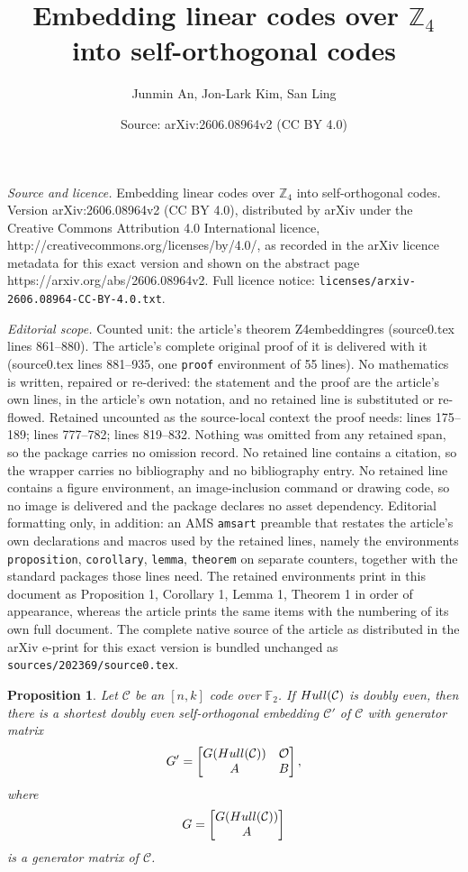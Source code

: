\documentclass[10pt,a4paper]{amsart}
\title{Embedding linear codes over $\mathbb{Z}_4$ into self-orthogonal codes}
\author{Junmin An, Jon-Lark Kim, San Ling}
\date{Source: arXiv:2606.08964v2 (CC BY 4.0)}
\newtheorem{proposition}{Proposition}
\begin{document}
\maketitle

\noindent\emph{Source and licence.} Embedding linear codes over $\mathbb{Z}_4$ into self-orthogonal codes. Version arXiv:2606.08964v2 (CC BY 4.0), distributed by arXiv under the Creative Commons Attribution 4.0 International licence, http://creativecommons.org/licenses/by/4.0/, as recorded in the arXiv licence metadata for this exact version and shown on the abstract page https://arxiv.org/abs/2606.08964v2. Full licence notice: \texttt{licenses/arxiv-2606.08964-CC-BY-4.0.txt}.\par\smallskip

\noindent\textit{Editorial scope.} Counted unit: the article's theorem Z4embeddingres (source0.tex lines 861--880). The article's complete original proof of it is delivered with it (source0.tex lines 881--935, one \texttt{proof} environment of 55 lines). No mathematics is written, repaired or re-derived: the statement and the proof are the article's own lines, in the article's own notation, and no retained line is substituted or re-flowed.  Retained uncounted as the source-local context the proof needs: lines 175--189; lines 777--782; lines 819--832.  Nothing was omitted from any retained span, so the package carries no omission record.  No retained line contains a citation, so the wrapper carries no bibliography and no bibliography entry.  No retained line contains a figure environment, an image-inclusion command or drawing code, so no image is delivered and the package declares no asset dependency.  Editorial formatting only, in addition: an AMS \texttt{amsart} preamble that restates the article's own declarations and macros used by the retained lines, namely the environments \texttt{proposition}, \texttt{corollary}, \texttt{lemma}, \texttt{theorem} on separate counters, together with the standard packages those lines need.  The retained environments print in this document as Proposition 1, Corollary 1, Lemma 1, Theorem 1 in order of appearance, whereas the article prints the same items with the numbering of its own full document.  The complete native source of the article as distributed in the arXiv e-print for this exact version is bundled unchanged as \texttt{sources/202369/source0.tex}.
\begin{proposition}\label{doublyevengen}
Let $\mathcal{C}$ be an $[n, k]$ code over $\mathbb{F}_2$. If ${\rm Hull}(\mathcal{C})$ is doubly even, then there is a shortest doubly even self-orthogonal embedding $\mathcal{C}'$ of $\mathcal{C}$ with generator matrix
\[
    G'=\begin{bmatrix}
        G({\rm Hull}(\mathcal{C})) & \mathcal{O}\\A & B
    \end{bmatrix},
\]
where
\[
G=\begin{bmatrix}
        G({\rm Hull}(\mathcal{C}))\\A
    \end{bmatrix}
\]
is a generator matrix of $\mathcal{C}$. 
\end{proposition}
\end{document}
